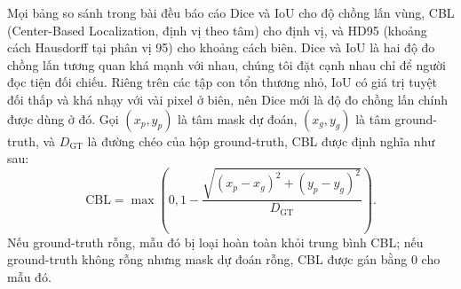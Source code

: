 \documentclass[11pt]{article}
\begin{document}
Mọi bảng so sánh trong bài đều báo cáo Dice và IoU cho độ chồng lấn vùng, CBL (Center-Based Localization, định vị theo tâm) cho định vị, và HD95 (khoảng cách Hausdorff tại phân vị 95) cho khoảng cách biên. Dice và IoU là hai độ đo chồng lấn tương quan khá mạnh với nhau, chúng tôi đặt cạnh nhau chỉ để người đọc tiện đối chiếu. Riêng trên các tập con tổn thương nhỏ, IoU có giá trị tuyệt đối thấp và khá nhạy với vài pixel ở biên, nên Dice mới là độ đo chồng lấn chính được dùng ở đó. Gọi $(x_p,y_p)$ là tâm mask dự đoán, $(x_g,y_g)$ là tâm ground-truth, và $D_{\mathrm{GT}}$ là đường chéo của hộp ground-truth, CBL được định nghĩa như sau:
\begin{equation}
\mathrm{CBL}=\max\left(0,1-\frac{\sqrt{(x_p-x_g)^2+(y_p-y_g)^2}}{D_{\mathrm{GT}}}\right).
\end{equation}
Nếu ground-truth rỗng, mẫu đó bị loại hoàn toàn khỏi trung bình CBL; nếu ground-truth không rỗng nhưng mask dự đoán rỗng, CBL được gán bằng 0 cho mẫu đó.
\end{document}
